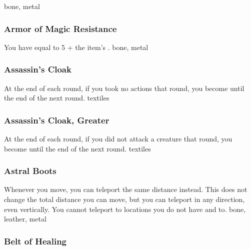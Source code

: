  bone, metal
\lowercase{\hypertarget{item:Armor of Magic Resistance}{}}\label{item:Armor of Magic Resistance}
\hypertarget{item:Armor of Magic Resistance}{\subsubsection{Armor of Magic Resistance\hfill{}}}
You have  equal to 5 + the item's .
 
 bone, metal
\lowercase{\hypertarget{item:Assassin's Cloak}{}}\label{item:Assassin's Cloak}
\hypertarget{item:Assassin's Cloak}{\subsubsection{Assassin's Cloak\hfill{}}}
At the end of each round, if you took no actions that round, you become  until the end of the next round.
 
 textiles
\lowercase{\hypertarget{item:Assassin's Cloak, Greater}{}}\label{item:Assassin's Cloak, Greater}
\hypertarget{item:Assassin's Cloak, Greater}{\subsubsection{Assassin's Cloak, Greater\hfill{}}}
At the end of each round, if you did not attack a creature that round, you become  until the end of the next round.
 
 textiles
\lowercase{\hypertarget{item:Astral Boots}{}}\label{item:Astral Boots}
\hypertarget{item:Astral Boots}{\subsubsection{Astral Boots\hfill{}}}
Whenever you move, you can teleport the same distance instead.
This does not change the total distance you can move, but you can teleport in any direction, even vertically.
You cannot teleport to locations you do not have  and  to.
 
 bone, leather, metal
\lowercase{\hypertarget{item:Belt of Healing}{}}\label{item:Belt of Healing}
\hypertarget{item:Belt of Healing}{\subsubsection{Belt of Healing\hfill{}}}
